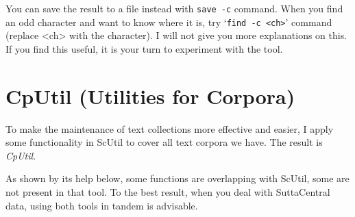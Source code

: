 You can save the result to a file instead with \texttt{save -c} command. When you find an odd character and want to know where it is, try `\texttt{find -c <ch>}' command (replace <ch> with the character). I will not give you more explanations on this. If you find this useful, it is your turn to experiment with the tool.

\section{CpUtil (Utilities for Corpora)}

To make the maintenance of text collections more effective and easier, I apply some functionality in ScUtil to cover all text corpora we have. The result is \emph{CpUtil}.


As shown by its help below, some functions are overlapping with ScUtil, some are not present in that tool. To the best result, when you deal with SuttaCentral data, using both tools in tandem is advisable.

